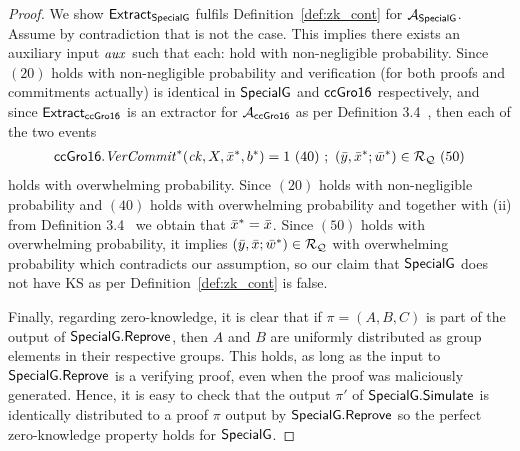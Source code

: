 \begin{proof}
\noindent We show ${\mathsf{Extract}}_{{\mathsf{SpecialG}}}$ fulfils Definition~\ref{def:zk_cont} for $\mathcal{A}_{{\mathsf{SpecialG}}}$. Assume by contradiction that is not the case. 
This implies there exists an auxiliary input $\mathit{aux}$ such that each: 
hold with non-negligible probability. Since $(20)$ holds with non-negligible probability and verification (for both proofs and commitments actually) is identical in ${\mathsf{SpecialG}}$ and ${\mathsf{ccGro16}}$ respectively, 
and since ${\mathsf{Extract}}_{{\mathsf{ccGro16}}}$ is an extractor for $\mathcal{A}_{{\mathsf{ccGro16}}}$ as per Definition 3.4~\cite{LegoSNARK},
 then each of the two events 
\begin{align*}
\mathit{{\mathsf{ccGro16}}.\mathit{VerCommit}^*}(\mathit{ck}, X, \bar{x}^*, b^*) =1 \ (40) \ ; \ (\bar{y}, \bar{x}^*; \bar{w}^*) \in  \mathcal{R}_{\mathcal{Q}} \ (50)
\end{align*}
holds with overwhelming probability. Since $(20)$ holds with non-negligible probability and $(40)$ holds with overwhelming probability and 
together with (ii) from Definition 3.4~\cite{LegoSNARK} we obtain that $\bar{x}^* = \bar{x}$. Since $(50)$ holds with overwhelming probability, it implies 
$(\bar{y}, \bar{x}; \bar{w}^*) \in \mathcal{R}_{\mathcal{Q}} $ with overwhelming probability which contradicts our assumption, so our claim that ${\mathsf{SpecialG}}$ does not have 
KS as per Definition~\ref{def:zk_cont} is false. 

Finally, regarding zero-knowledge, it is clear that if $\pi = (A, B, C)$ is part of the output of ${\mathsf{SpecialG}}.{\mathsf{Reprove}}$, 
then $A$ and $B$ are uniformly distributed as group elements in their respective groups. This holds, as long as the input to ${\mathsf{SpecialG}}.{\mathsf{Reprove}}$ is a verifying proof, even when the proof was maliciously generated. Hence, it is easy to check  
that the output $\pi'$ of ${\mathsf{SpecialG}}.{\mathsf{Simulate}}$ is identically distributed to a proof $\pi$ output by ${\mathsf{SpecialG}}.{\mathsf{Reprove}}$ so the perfect 
zero-knowledge property holds for ${\mathsf{SpecialG}}$. 
\end{proof}



